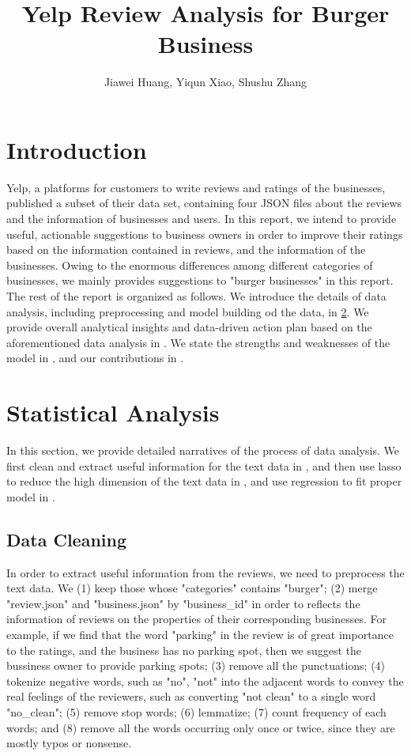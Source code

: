 \documentclass[12pt]{article}
\title{Yelp Review Analysis for Burger Business}
\author{Jiawei Huang, Yiqun Xiao, Shushu Zhang}
\begin{document}
\maketitle

\section{Introduction}
\label{sec:1}
Yelp, a platforms for customers to write reviews and ratings of the businesses, published a subset of their data set, containing four JSON files about the reviews and the information of businesses and users. In this report, we intend to provide useful, actionable suggestions to business owners in order to improve their ratings based on the information contained in reviews, and the information of the businesses. Owing to the enormous differences among different categories of businesses, we mainly provides suggestions to "burger businesses" in this report. The rest of the report is organized as follows. We introduce the details of data analysis, including preprocessing and model building od the data, in \cref{sec:2}. We provide overall analytical insights and data-driven action plan based on the aforementioned data analysis in . We state the strengths and weaknesses of the model in , and our contributions in .


\section{Statistical Analysis}
\label{sec:2}
In this section, we provide detailed narratives of the process of data analysis. We first clean and extract useful information for the text data in , and then use lasso to reduce the high dimension of the text data in , and use regression to fit proper model in . 
\subsection{Data Cleaning}
\label{subsec:Cleaning}
In order to extract useful information from the reviews, we need to preprocess the text data. We (1) keep those whose "categories" contains "burger"; (2) merge "review.json" and "business.json" by "business\_id" in order to reflects the information of reviews on the properties of their corresponding businesses. For example, if we find that the word "parking" in the review is of great importance to the ratings, and the business has no parking spot, then we suggest the bussiness owner to provide parking spots; (3) remove all the punctuations; (4) tokenize negative words, such as "no", "not" into the adjacent words to convey the real feelings of the reviewers, such as converting "not clean" to a single word "no\_clean"; (5) remove stop words; (6) lemmatize; (7) count frequency of each words; and (8) remove all the words occurring only once or twice, since they are mostly typos or nonsense. 
\end{document}
